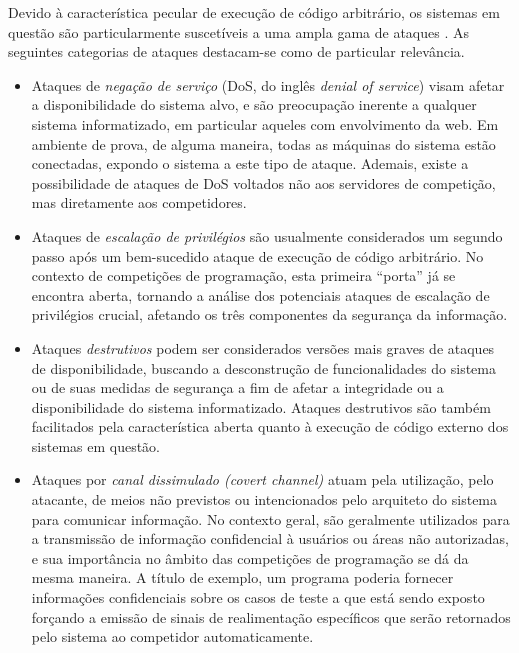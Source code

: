 \documentclass[ruledheader]{abnt}
\begin{document}
Devido à característica pecular de execução de código arbitrário, os sistemas em questão são particularmente suscetíveis a uma ampla gama de ataques \cite{tochev2010,forisek2006security}. As seguintes categorias de ataques destacam-se como de particular relevância.
\begin{itemize}
	\item Ataques de \emph{negação de serviço} (DoS, do inglês \emph{denial of service}) visam afetar a disponibilidade do sistema alvo, e são preocupação inerente a qualquer sistema informatizado, em particular aqueles com envolvimento da web. Em ambiente de prova, de alguma maneira, todas as máquinas do sistema estão conectadas, expondo o sistema a este tipo de ataque. Ademais, existe a possibilidade de ataques de DoS voltados não aos servidores de competição, mas diretamente aos competidores.
	
	\item Ataques de \emph{escalação de privilégios} são usualmente considerados um segundo passo após um bem-sucedido ataque de execução de código arbitrário. No contexto de competições de programação, esta primeira ``porta'' já se encontra aberta, tornando a análise dos potenciais ataques de escalação de privilégios crucial, afetando os três componentes da segurança da informação.
	
	\item Ataques \emph{destrutivos} podem ser considerados versões mais graves de ataques de disponibilidade, buscando a desconstrução de funcionalidades do sistema ou de suas medidas de segurança a fim de afetar a integridade ou a disponibilidade do sistema informatizado. Ataques destrutivos são também facilitados pela característica aberta quanto à execução de código externo dos sistemas em questão.
	
	\item Ataques por \emph{canal dissimulado (covert channel)} atuam pela utilização, pelo atacante, de meios não previstos ou intencionados pelo arquiteto do sistema para comunicar informação. No contexto geral, são geralmente utilizados para a transmissão de informação confidencial à usuários ou áreas não autorizadas, e sua importância no âmbito das competições de programação se dá da mesma maneira. A título de exemplo, um programa poderia fornecer informações confidenciais sobre os casos de teste a que está sendo exposto forçando a emissão de sinais de realimentação específicos que serão retornados pelo sistema ao competidor automaticamente.
\end{itemize}
\end{document}

